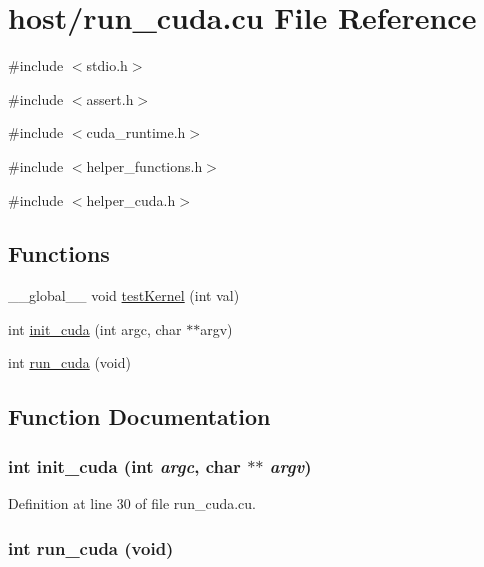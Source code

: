 \hypertarget{run__cuda_8cu}{
\section{host/run\_\-cuda.cu File Reference}
\label{run__cuda_8cu}
}
{\ttfamily \#include $<$stdio.h$>$}\par
{\ttfamily \#include $<$assert.h$>$}\par
{\ttfamily \#include $<$cuda\_\-runtime.h$>$}\par
{\ttfamily \#include $<$helper\_\-functions.h$>$}\par
{\ttfamily \#include $<$helper\_\-cuda.h$>$}\par
\subsection*{Functions}
\begin{DoxyCompactItemize}
\item 
\_\-\_\-global\_\-\_\- void \hyperlink{run__cuda_8cu_a6e9fe17e0d6f904d708c6f3e8a65c888}{testKernel} (int val)
\item 
int \hyperlink{run__cuda_8cu_af6e8db35574ea9bd97fa607d0a0b42c7}{init\_\-cuda} (int argc, char $\ast$$\ast$argv)
\item 
int \hyperlink{run__cuda_8cu_a431dbb4d26aaaf18c5d5e66f82c42e9c}{run\_\-cuda} (void)
\end{DoxyCompactItemize}


\subsection{Function Documentation}
\hypertarget{run__cuda_8cu_af6e8db35574ea9bd97fa607d0a0b42c7}{
\subsubsection[{init\_\-cuda}]{\setlength{\rightskip}{0pt plus 5cm}int init\_\-cuda (int {\em argc}, \/  char $\ast$$\ast$ {\em argv})}}
\label{run__cuda_8cu_af6e8db35574ea9bd97fa607d0a0b42c7}


Definition at line 30 of file run\_\-cuda.cu.\hypertarget{run__cuda_8cu_a431dbb4d26aaaf18c5d5e66f82c42e9c}{
\subsubsection[{run\_\-cuda}]{\setlength{\rightskip}{0pt plus 5cm}int run\_\-cuda (void)}}
\label{run__cuda_8cu_a431dbb4d26aaaf18c5d5e66f82c42e9c}


